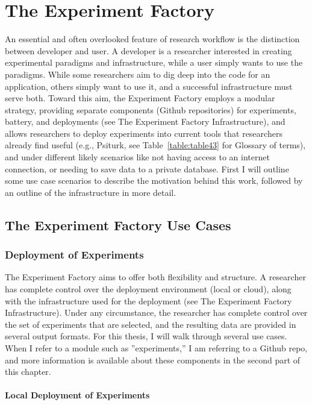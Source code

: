 \documentclass{report}
\begin{document}
\section{The Experiment Factory}

An essential and often overlooked feature of research workflow is the
distinction between developer and user. A developer is a researcher
interested in creating experimental paradigms and infrastructure, while
a user simply wants to use the paradigms. While some researchers aim to
dig deep into the code for an application, others simply want to use it, and a successful infrastructure must serve both. Toward this aim, the
Experiment Factory employs a modular strategy, providing separate
components (Github repositories) for experiments, battery, and
deployments (see The Experiment Factory Infrastructure),
and allows researchers to deploy experiments into current tools that
researchers already find useful (e.g., Psiturk, see Table~\ref{table:table43} for Glossary
of terms), and under different likely scenarios like not having access
to an internet connection, or needing to save data to a private
database. First I will outline some use case scenarios to describe the
motivation behind this work, followed by an outline of the
infrastructure in more detail.

\subsection{The Experiment Factory Use Cases}

\subsubsection{Deployment of Experiments}
The Experiment Factory aims to offer both flexibility and structure. A
researcher has complete control over the deployment environment (local
or cloud), along with the infrastructure used for the deployment (see
The Experiment Factory Infrastructure). Under any
circumstance, the researcher has complete control over the set of
experiments that are selected, and the resulting data are provided in
several output formats. For this thesis, I will walk through several use
cases. When I refer to a module such as ''experiments,'' I am referring
to a Github repo, and more information is available about these
components in the second part of this chapter.

\paragraph{Local Deployment of Experiments}
\end{document}
